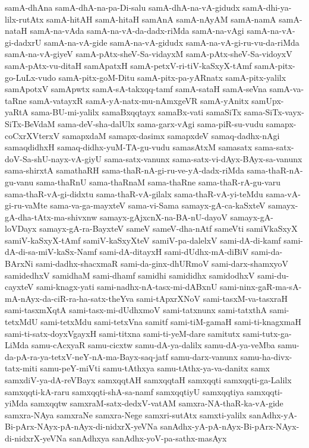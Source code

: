 {samA-dhAna
samA-dhA-na-pa-Di-salu
samA-dhA-na-vA-gidudx
samA-dhi-ya-lilx-rutAtx
samA-hitAH
samA-hitaH
samAnA
samA-nAyAM
samA-namA
samA-nataH
samA-na-vAda
samA-na-vA-da-dadx-riMda
samA-na-vAgi
samA-na-vA-gi-dadxrU
samA-na-vA-gide
samA-na-vA-gidudx
samA-na-vA-gi-ru-vu-da-riMda
samA-na-vA-giyeV
samA-pAtx-sheV-Sa-vidayxM
samA-pAtx-sheV-Sa-vidoyxV
samA-pAtx-vu-ditaH
samApatxH
samA-petxV-ri-tiV-kaSxyX-tAmf
samA-pitx-go-LuLx-vudo
samA-pitx-goM-Ditu
samA-pitx-pa-yARnatx
samA-pitx-yalilx
samApotxV
samApwtx
samA-sA-takxqq-tamf
samA-sataH
samA-seVna
samA-va-taRne
samA-vatayxR
samA-yA-natx-mu-nAmxgeVR
samA-yAnitx
samUpx-yaRtA
sama-BU-mi-yalilx
samaBxqqtayx
samaBx-vati
samaSiTx
sama-SiTx-vayx-SiTx-BeVdaM
sama-deV-sha-dalUlx
sama-garx-vAgi
sama-piR-su-vudu
samapx-coCxrXVterxV
samapxdaM
samapx-dasimx
samapxdeV
samaq-dadhx-nAgi
samaqdidhxH
samaq-didhx-yuM-TA-gu-vudu
samasAtxM
samasatx
sama-satx-doV-Sa-shU-nayx-vA-giyU
sama-satx-vanunx
sama-satx-vi-dAyx-BAyx-sa-vanunx
sama-shirxtA
samathaRH
sama-thaR-nA-gi-ru-ve-yA-dadx-riMda
sama-thaR-nA-gu-vanu
sama-thaRnU
sama-thaRnaM
sama-thaRne
sama-thaR-rA-gu-varu
sama-thaR-vA-gi-didxtu
sama-thaR-vA-gilalx
sama-thaR-vA-yi-teMdu
sama-vA-gi-ru-vaMte
sama-va-ga-mayxteV
sama-vi-Sama
samayx-gA-ca-kaSxteV
samayx-gA-dha-tAtx-ma-shivxnw
samayx-gAjxcnX-na-BA-nU-dayoV
samayx-gA-loVDayx
samayx-gA-ra-BayxteV
sameV
sameV-dha-nAtf
sameVti
samiVkaSxyX
samiV-kaSxyX-tAmf
samiV-kaSxyXteV
samiV-pa-dalelxV
sami-dA-di-kamf
sami-dA-di-sa-miV-kaSx-Namf
sami-dA-ditayxH
sami-dUdhx-mA-diBiV
sami-da-BArxNi
sami-dadhx-shacxmaR
sami-da-ginx-dhURmoV
sami-darx-shamxyoV
samidedhxV
samidhaM
sami-dhamf
samidhi
samididhx
samidodhxV
sami-du-cayxteV
sami-knagx-yati
sami-nadhx-nA-tasx-mi-dABxnU
sami-ninx-gaR-ma-sA-mA-nAyx-da-ciR-ra-ha-satx-theYva
sami-tApxrXNoV
sami-tasxM-va-tasxraH
sami-tasxmXqtA
sami-tasx-mi-dUdhxmoV
sami-tatxnunx
sami-tatxthA
sami-tetxMdU
sami-tetxMdu
sami-tetxVna
samitf
sami-tiM-gamaH
sami-ti-knagxmaH
sami-ti-satx-doyxVgayxH
sami-titxna
sami-ti-yeM-dare
samitutx
sami-tutx-ga-LiMda
samu-cAcxyaR
samu-cicxtw
samu-dA-ya-dalilx
samu-dA-ya-veMba
samu-da-pA-ra-ya-tetxV-neY-nA-ma-Bayx-saq-jatf
samu-darx-vanunx
samu-ha-divx-tatx-miti
samu-peY-miVti
samu-tAthxya
samu-tAthx-ya-va-danitx
samx
samxdiV-ya-dA-reVBayx
samxqqtAH
samxqqtaH
samxqqti
samxqqti-ga-Lalilx
samxqqti-kA-raru
samxqqti-shA-sa-namf
samxqqtiyU
samxqqtiya
samxqqti-yiMda
samxqqtw
samxraM-satx-dedxV-vatAM
samxra-NA-thaR-ka-vA-gide
samxra-NAya
samxraNe
samxra-Nege
samxri-sutAtx
samxti-yalilx
sanAdhx-yA-Bi-pArx-NAyx-pA-nAyx-di-nidxrX-yeVNa
sanAdhx-yA-pA-nAyx-Bi-pArx-NAyx-di-nidxrX-yeVNa
sanAdhxya
sanAdhx-yoV-pa-sathx-masAyx
}
